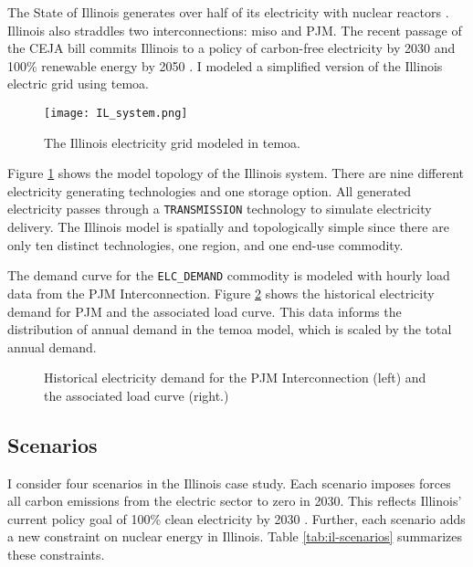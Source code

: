 The State of Illinois generates over half of its electricity with nuclear reactors
\cite{energy_information_administration_eia_nodate}.
Illinois also straddles two interconnections: \gls{miso} and PJM. The recent
passage of the CEJA bill commits Illinois to a policy of carbon-free electricity
by 2030 and 100\% renewable energy by 2050 \cite{harmon_climate_2021}.
I modeled a simplified version of the Illinois electric grid using \gls{temoa}.

\begin{figure}[H]
  \centering
  \texttt{[image: IL\_system.png]}
  \caption{The Illinois electricity grid modeled in \gls{temoa}.}
  \label{fig:ilsys}
\end{figure}

Figure \ref{fig:ilsys} shows the model topology of the Illinois system. There
are nine different electricity generating technologies and one storage option.
All generated electricity passes through a \texttt{TRANSMISSION} technology
to simulate electricity delivery. The Illinois model is spatially and topologically
simple since there are only ten distinct technologies, one region, and one
end-use commodity.

The demand curve for the \texttt{ELC\_DEMAND} commodity is modeled with hourly load
data from the PJM Interconnection. Figure \ref{fig:pjm-elc} shows the historical
electricity demand for PJM and the associated load curve. This data informs the
distribution of annual demand in the \gls{temoa} model, which is scaled by the
total annual demand.

\begin{figure}[H]
  \centering
  \resizebox{\columnwidth}{!}{}
  \caption{Historical electricity demand for the PJM Interconnection (left) and
  the associated load curve (right.)}
  \label{fig:pjm-elc}
\end{figure}

\subsection{Scenarios}
I consider four scenarios in the Illinois case study. Each scenario imposes forces
all carbon emissions from the electric sector to zero in 2030. This reflects Illinois'
current policy goal of 100\% clean electricity by 2030 \cite{office_of_governor_jb_pritzker_gov_2021}.
Further, each scenario adds a new constraint on nuclear energy in Illinois. Table
\ref{tab:il-scenarios} summarizes these constraints.


